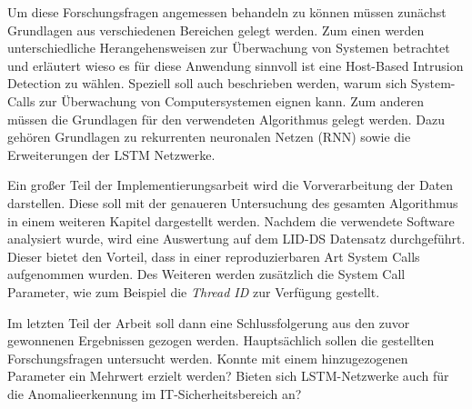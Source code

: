 Um diese Forschungsfragen angemessen behandeln zu können müssen zunächst Grundlagen aus verschiedenen Bereichen gelegt werden.
Zum einen werden unterschiedliche Herangehensweisen zur Überwachung von Systemen betrachtet und erläutert wieso es für diese Anwendung sinnvoll ist eine Host-Based Intrusion Detection zu wählen.
Speziell soll auch beschrieben werden, warum sich System-Calls zur Überwachung von Computersystemen eignen kann.
Zum anderen müssen die Grundlagen für den verwendeten Algorithmus gelegt werden.
Dazu gehören Grundlagen zu rekurrenten neuronalen Netzen (RNN) sowie die Erweiterungen der LSTM Netzwerke.

Ein großer Teil der Implementierungsarbeit wird die Vorverarbeitung der Daten darstellen.
Diese soll mit der genaueren Untersuchung des gesamten Algorithmus in einem weiteren Kapitel dargestellt werden.
Nachdem die verwendete Software analysiert wurde, wird eine Auswertung auf dem LID-DS \cite{LID-DS} Datensatz durchgeführt.
Dieser bietet den Vorteil, dass in einer reproduzierbaren Art System Calls aufgenommen wurden.
Des Weiteren werden zusätzlich die System Call Parameter, wie zum Beispiel die \textit{Thread ID} zur Verfügung gestellt.

Im letzten Teil der Arbeit soll dann eine Schlussfolgerung aus den zuvor gewonnenen Ergebnissen gezogen werden. 
Hauptsächlich sollen die gestellten Forschungsfragen untersucht werden.
Konnte mit einem hinzugezogenen Parameter ein Mehrwert erzielt werden?
Bieten sich LSTM-Netzwerke auch für die Anomalieerkennung im IT-Sicherheitsbereich an?
